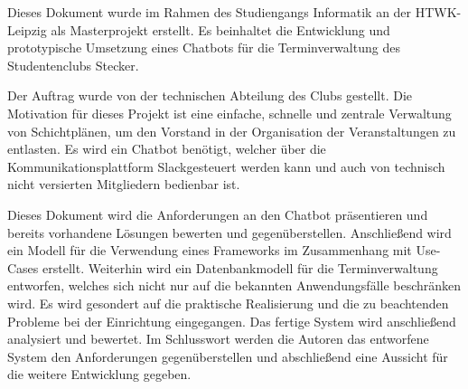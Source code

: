 Dieses Dokument wurde im Rahmen des Studiengangs Informatik an der HTWK-Leipzig als Masterprojekt erstellt. Es beinhaltet die Entwicklung und prototypische Umsetzung eines Chatbots für die Terminverwaltung des Studentenclubs \glqq Stecker\grqq .

Der Auftrag wurde von der technischen Abteilung des Clubs gestellt. Die Motivation für dieses Projekt ist eine einfache, schnelle und zentrale Verwaltung von Schichtplänen, um den Vorstand in der Organisation der Veranstaltungen zu entlasten.
Es wird ein Chatbot benötigt, welcher über die Kommunikationsplattform \glqq Slack\grqq gesteuert werden kann und auch von technisch nicht versierten Mitgliedern bedienbar ist.

Dieses Dokument wird die Anforderungen an den Chatbot präsentieren und bereits vorhandene Lösungen bewerten und gegenüberstellen. Anschließend wird ein Modell für die Verwendung eines Frameworks im Zusammenhang mit Use-Cases erstellt. Weiterhin wird ein Datenbankmodell für die Terminverwaltung entworfen, welches sich nicht nur auf die bekannten Anwendungsfälle beschränken wird. Es wird gesondert auf die praktische Realisierung und die zu beachtenden Probleme bei der Einrichtung eingegangen. Das fertige System wird anschließend analysiert und bewertet. Im Schlusswort werden die Autoren das entworfene System den Anforderungen gegenüberstellen und abschließend eine Aussicht für die weitere Entwicklung gegeben.
